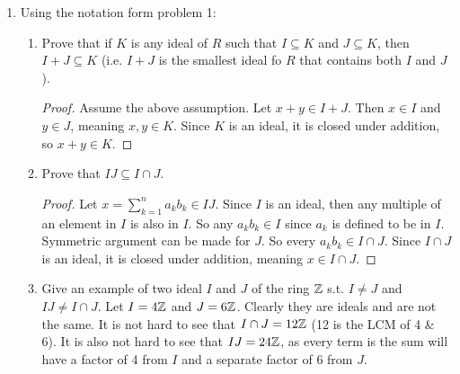\documentclass[12pt]{article}
\begin{document}
\begin{enumerate}
\begin{enumerate}
			\item $IJ = \{\sum_{k=1}^{n} a_kb_k : n\geq0, a_k \in I, b_k \in J \ \forall k\in[n]\}$
			\begin{proof}
				First to show $IJ$ is a group with respect to $+$.\\
				Same operation as in $R$, so it is associative. The identity 0 is clearly in $IJ$. Inverses are also in $IJ$, take one inverse of $a_k$ or $b_k$, just not both to get the inverse. 
				
				Now for closure. Let $x,y \in IJ$ where $x = \sum_{k=1}^{n} a_kb_k$ and $y = \sum_{k=1}^{m} a'_kb'_k$. Then $x+y$ is just an even bigger sum, where each term is a product of an element from $I$ and an element from $J$, meaning $x+y \in IJ$.
				
				Now to show the ideal part. Let $x \in IJ$ and $r \in R$, with $x = \sum_{k=1}^{n} a_kb_k$. $rx = \sum_{k=1}^{n} ra_kb_k$, and $ra_k \in I$ since $I$ is an ideal. So $rx \in IJ$.
			\end{proof}

		\end{enumerate}
		
		\item Using the notation form problem 1:
		\begin{enumerate}
			\item Prove that if $K$ is any ideal of $R$ such that $I \subseteq K$ and $J \subseteq K$, then $I+J \subseteq K$ (i.e. $I+J$ is the smallest ideal fo $R$ that contains both $I$ and $J$).
			\begin{proof}
				Assume the above assumption. Let $x+y \in I+J$. Then $x \in I$ and $y \in J$, meaning $x,y \in K$. Since $K$ is an ideal, it is closed under addition, so $x+y \in K$.
			\end{proof}
			
			\item Prove that $IJ \subseteq I \cap J$.
			\begin{proof}
				Let $x = \sum_{k=1}^{n} a_kb_k \in IJ$. Since $I$ is an ideal, then any multiple of an element in $I$ is also in $I$. So any $a_kb_k \in I$ since $a_k$ is defined to be in $I$. Symmetric argument can be made for $J$. So every $a_kb_k \in I \cap J$. Since $I \cap J$ is an ideal, it is closed under addition, meaning $x \in I \cap J$.
			\end{proof}
			
			\item Give an example of two ideal $I$ and $J$ of the ring $\mathbb{Z}$ s.t. $I \neq J$ and $IJ \neq I \cap J$.\m 
			Let $I = 4\mathbb{Z}$ and $J = 6\mathbb{Z}$. Clearly they are ideals and are not the same. It is not hard to see that $I \cap J = 12\mathbb{Z}$ (12 is the LCM of 4 \& 6). It is also not hard to see that $IJ = 24\mathbb{Z}$, as every term is the sum will have a factor of 4 from $I$ and a separate factor of 6 from $J$.
		\end{enumerate}
	

\end{enumerate}
\end{document}
